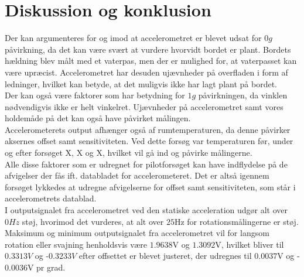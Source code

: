 \section{Diskussion og konklusion}
Der kan argumenteres for og imod at accelerometret er blevet udsat for $0g$ påvirkning, da det kan være svært at vurdere hvorvidt bordet er plant. Bordets hældning blev målt med et vaterpas, men der er mulighed for, at vaterpasset kan være upræcist. Accelerometret har desuden ujævnheder på overfladen i form af ledninger, hvilket kan betyde, at det muligvis ikke har lagt plant på bordet. \\
Der kan også være faktorer som har betydning for $1g$ påvirkningen, da vinklen nødvendigvis ikke er helt vinkelret. Ujævnheder på accelerometret samt vores holdemåde på det kan også have påvirket målingen. \\
Accelerometerets output afhænger også af rumtemperaturen, da denne påvirker aksernes offset samt sensitiviteten. Ved dette forsøg var temperaturen før, under og efter forsøget {\color{red}X, X og X}, hvilket vil gå ind og påvirke målingerne. \\
Alle disse faktorer som er udregnet for pilotforsøget kan have indflydelse på de afvigelser der fås ift. databladet for accelerometeret. Det er altså igennem forsøget lykkedes at udregne afvigelserne for offset samt sensitiviteten, som står i accelerometrets datablad.  \\

I outputsignalet fra accelerometret ved den statiske acceleration udgør alt over $0Hz$ støj, hvorimod det vurderes, at alt over $25$Hz for rotationsmålingerne er støj. Maksimum og minimum outputsignalet fra accelerometret vil for langsom rotation eller svajning henholdsvis være $1.9638$V og $1.3092$V, hvilket bliver til $0.3313V$ og -$0.3233V$ efter offsettet er blevet justeret, der udregnes til $0.0037$V og -$0.0036$V pr grad. \\